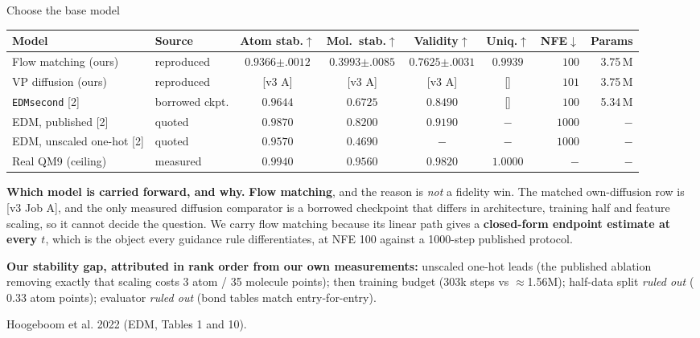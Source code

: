\documentclass[aspectratio=169,10pt]{beamer}
\newcommand{\theslidelabel}{}
\newcommand{\lbl}[1]{\renewcommand{\theslidelabel}{#1}}
\newcommand{\srcs}[1]{\vfill{\raggedleft\color{grayt}\fontsize{4.9}{5.6}\selectfont #1\par}}
\newcommand{\TODO}[1]{\textcolor{accent}{\scriptsize[#1]}}
\begin{document}
\lbl{2a}
\begin{frame}{Choose the base model}
  \centering
  {\small
  \begin{tabular}{llccccrr}
    \toprule
    Model & Source & Atom stab.$\uparrow$ & Mol.\ stab.$\uparrow$ & Validity$\uparrow$ & Uniq.$\uparrow$ & NFE$\downarrow$ & Params \\
    \midrule
    Flow matching (ours) & reproduced & $0.9366${\tiny$\pm.0012$} & $0.3993${\tiny$\pm.0085$} & $0.7625${\tiny$\pm.0031$} & $0.9939$ & $100$ & 3.75\,M \\
    VP diffusion (ours) & reproduced & \TODO{v3 A} & \TODO{v3 A} & \TODO{v3 A} & \TODO{} & $101$ & 3.75\,M \\
    \midrule
    \texttt{EDMsecond} [2] & borrowed ckpt. & $0.9644$ & $0.6725$ & $0.8490$ & \TODO{} & $100$ & 5.34\,M \\
    EDM, published [2] & quoted & $0.9870$ & $0.8200$ & $0.9190$ & $-$ & $1000$ & $-$ \\
    EDM, unscaled one-hot [2] & quoted & $0.9570$ & $0.4690$ & $-$ & $-$ & $1000$ & $-$ \\
    Real QM9 (ceiling) & measured & $0.9940$ & $0.9560$ & $0.9820$ & $1.0000$ & $-$ & $-$ \\
    \bottomrule
  \end{tabular}}

  \medskip
  \raggedright
  \textbf{Which model is carried forward, and why.} \textbf{Flow matching}, and the
  reason is \emph{not} a fidelity win. The matched own-diffusion row is
  \TODO{v3 Job A}, and the only measured diffusion comparator is a borrowed
  checkpoint that differs in architecture, training half and feature scaling, so it
  cannot decide the question. We carry flow matching because its linear path gives a
  \textbf{closed-form endpoint estimate at every $t$}, which is the object every
  guidance rule differentiates, at NFE 100 against a 1000-step published protocol.

  \smallskip
  \textbf{Our stability gap, attributed in rank order from our own measurements:}
  unscaled one-hot leads (the published ablation removing exactly that scaling costs
  3 atom / 35 molecule points); then training budget (303k steps vs $\approx$1.56M);
  half-data split \emph{ruled out} ($0.33$ atom points); evaluator \emph{ruled out}
  (bond tables match entry-for-entry).

  \srcs{[2] Hoogeboom et al. 2022 (EDM, Tables 1 and 10).}
\end{frame}
\end{document}
